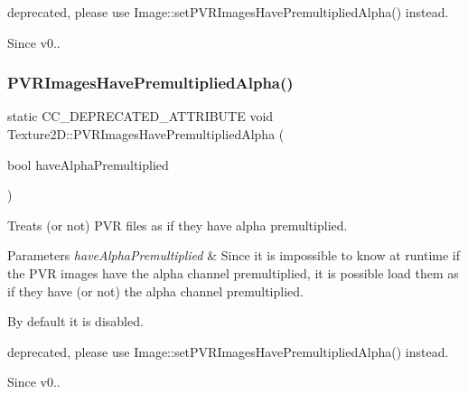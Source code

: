 deprecated, please use Image\+::set\+P\+V\+R\+Images\+Have\+Premultiplied\+Alpha() instead.

\begin{DoxySince}{Since}
v0.. 
\end{DoxySince}
\mbox{\label{classTexture2D_ae7ffb5940ab10a05213b85456eafff2f}} 
\subsubsection{\texorpdfstring{P\+V\+R\+Images\+Have\+Premultiplied\+Alpha()}{PVRImagesHavePremultipliedAlpha()}\hspace{0.1cm}{\footnotesize\ttfamily [2/2]}}
{\footnotesize\ttfamily static C\+C\+\_\+\+D\+E\+P\+R\+E\+C\+A\+T\+E\+D\+\_\+\+A\+T\+T\+R\+I\+B\+U\+TE void Texture2\+D\+::\+P\+V\+R\+Images\+Have\+Premultiplied\+Alpha (\begin{DoxyParamCaption}\item[{bool}]{have\+Alpha\+Premultiplied }\end{DoxyParamCaption})\hspace{0.3cm}{\ttfamily [static]}}

Treats (or not) P\+VR files as if they have alpha premultiplied.


\begin{DoxyParams}{Parameters}
{\em have\+Alpha\+Premultiplied} & Since it is impossible to know at runtime if the P\+VR images have the alpha channel premultiplied, it is possible load them as if they have (or not) the alpha channel premultiplied.\\
\hline
\end{DoxyParams}
By default it is disabled.

deprecated, please use Image\+::set\+P\+V\+R\+Images\+Have\+Premultiplied\+Alpha() instead.

\begin{DoxySince}{Since}
v0.. 
\end{DoxySince}
\mbox{\label{classTexture2D_ae9edf32b4f3dc4841e09a2b1835fc08c}} 
